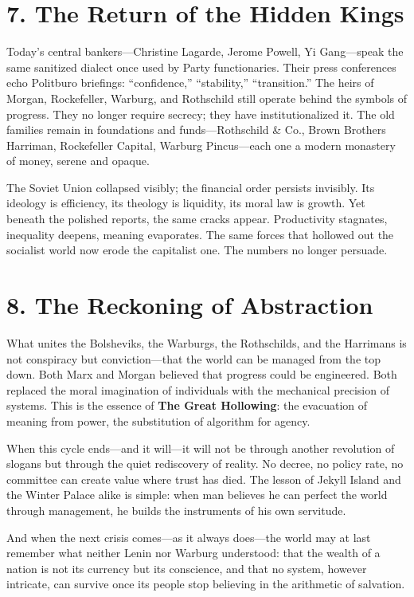 \documentclass[11pt,twoside]{book}
\begin{document}
\section*{7. The Return of the Hidden Kings}

Today’s central bankers—Christine Lagarde, Jerome Powell, Yi Gang—speak the same sanitized dialect once used by Party functionaries.  
Their press conferences echo Politburo briefings: “confidence,” “stability,” “transition.”  
The heirs of Morgan, Rockefeller, Warburg, and Rothschild still operate behind the symbols of progress.  
They no longer require secrecy; they have institutionalized it.  
The old families remain in foundations and funds—Rothschild \& Co., Brown Brothers Harriman, Rockefeller Capital, Warburg Pincus—each one a modern monastery of money, serene and opaque.

The Soviet Union collapsed visibly; the financial order persists invisibly.  
Its ideology is efficiency, its theology is liquidity, its moral law is growth.  
Yet beneath the polished reports, the same cracks appear.  
Productivity stagnates, inequality deepens, meaning evaporates.  
The same forces that hollowed out the socialist world now erode the capitalist one.  
The numbers no longer persuade.

\section*{8. The Reckoning of Abstraction}

What unites the Bolsheviks, the Warburgs, the Rothschilds, and the Harrimans is not conspiracy but conviction—that the world can be managed from the top down.  
Both Marx and Morgan believed that progress could be engineered.  
Both replaced the moral imagination of individuals with the mechanical precision of systems.  
This is the essence of \textbf{The Great Hollowing}: the evacuation of meaning from power, the substitution of algorithm for agency.

When this cycle ends—and it will—it will not be through another revolution of slogans but through the quiet rediscovery of reality.  
No decree, no policy rate, no committee can create value where trust has died.  
The lesson of Jekyll Island and the Winter Palace alike is simple:  
when man believes he can perfect the world through management, he builds the instruments of his own servitude.

And when the next crisis comes—as it always does—the world may at last remember what neither Lenin nor Warburg understood:  
that the wealth of a nation is not its currency but its conscience,  
and that no system, however intricate, can survive once its people stop believing in the arithmetic of salvation.
\end{document}
